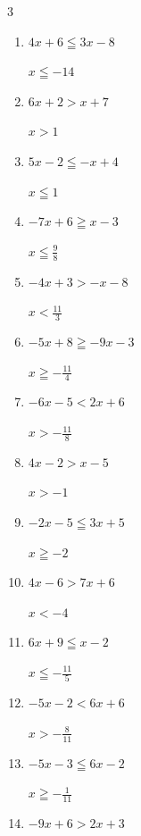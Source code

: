 \begin{multicols}{3}
\begin{enumerate}
        $\displaystyle x<-\frac{12}{13}$

  \item $4x+6\leqq 3x-8$

        $\displaystyle x\leqq -14$

  \item $6x+2>x+7$

        $\displaystyle x>1$

  \item $5x-2\leqq -x+4$

        $\displaystyle x\leqq 1$

\columnbreak %

  \item $-7x+6\geqq x-3$

        $\displaystyle x\leqq \frac{9}{8}$

  \item $-4x+3>-x-8$

        $\displaystyle x<\frac{11}{3}$

  \item $-5x+8\geqq -9x-3$

        $\displaystyle x\geqq -\frac{11}{4}$

  \item $-6x-5<2x+6$

        $\displaystyle x>-\frac{11}{8}$

  \item $4x-2>x-5$

        $\displaystyle x>-1$

  \item $-2x-5\leqq 3x+5$

        $\displaystyle x\geqq -2$

  \item $4x-6>7x+6$

        $\displaystyle x<-4$

  \item $6x+9\leqq x-2$

        $\displaystyle x\leqq -\frac{11}{5}$

  \item $-5x-2<6x+6$

        $\displaystyle x>-\frac{8}{11}$

  \item $-5x-3\leqq 6x-2$

        $\displaystyle x\geqq -\frac{1}{11}$

  \item $-9x+6>2x+3$


\end{enumerate}
\end{multicols}
